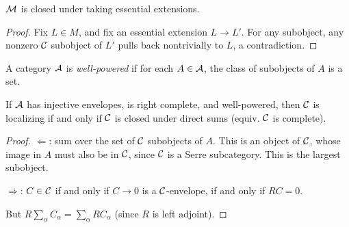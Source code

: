 \begin{por}
$\mathcal{M}$ is closed under taking essential extensions.
\end{por}
\begin{proof}
Fix $L \in M$, and fix an essential extension $L \to L'$. For any 
subobject, any nonzero $\mathcal{C}$ subobject of $L'$ pulls back 
nontrivially to $L$, a contradiction.
\end{proof}

\begin{definition}
A category $\mathcal{A}$ is \emph{well-powered} if for each $A \in
\mathcal{A}$, the class of subobjects of $A$ is a set.
\end{definition}

\begin{cor}
If $\mathcal{A}$ has injective envelopes, is right complete, and
well-powered, then $\mathcal{C}$ is localizing if and only if $\mathcal{C}$
is closed under direct sums (equiv. $\mathcal{C}$ is complete).
\end{cor}
\begin{proof}
\noindent $\Leftarrow$: sum over the set of $\mathcal{C}$ subobjects
of $A$. This is an object of $\mathcal{C}$, whose image in $A$ must
also be in $\mathcal{C}$, since $\mathcal{C}$ is a Serre subcategory. This
is the largest subobject.

\noindent $\Rightarrow$: $C \in \mathcal{C}$ if and only if $C \to 0$
is a $\mathcal{C}$-envelope, if and only if $RC = 0$.

But $R\sum_{\alpha} C_\alpha = \sum_{\alpha} RC_\alpha$ (since $R$
is left adjoint).
\end{proof}

